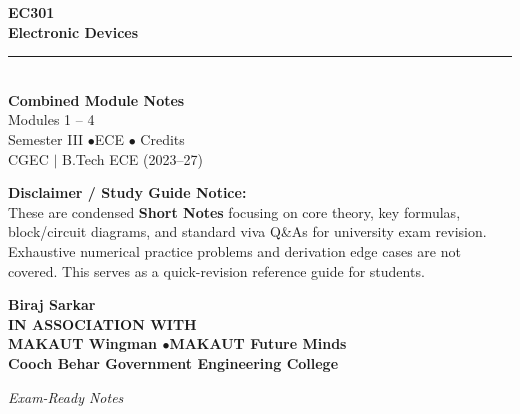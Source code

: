 \documentclass[12pt,a4paper]{article}
\begin{document}
\thispagestyle{empty}


\vspace*{1.0cm}
\begin{center}
  {\Huge\bfseries\color{myred} EC301}\\[10pt]
  {\LARGE\bfseries\color{mydark} Electronic Devices}\\[20pt]
  {\color{myred}\rule{0.7\linewidth}{1.5pt}}\\[18pt]
  {\Large\color{myteal}\textbf{Combined Module Notes}}\\[8pt]
  {\large\color{mydark} Modules 1 -- 4}\\[40pt]
  {\normalsize\color{mydark} Semester III \quad$\bullet$\quad ECE \quad$\bullet$ Credits}\\[12pt]
  {\normalsize\color{mydark} CGEC \;$|$\; B.Tech ECE (2023--27)}
\end{center}
\vspace{1.0cm}
\begin{center}
  \begin{tcolorbox}[colback=mygray, colframe=mgframe, boxrule=0.5pt, arc=3pt, width=0.85\linewidth]
    \centering\small\color{mydark}
    \textbf{Disclaimer / Study Guide Notice:}\\
    These are condensed \textbf{Short Notes} focusing on core theory, key formulas, block/circuit diagrams, and standard viva Q\&As for university exam revision. Exhaustive numerical practice problems and derivation edge cases are not covered. This serves as a quick-revision reference guide for students.
  \end{tcolorbox}
\end{center}
\vfill
\vspace{0.6cm}
\begin{center}
  {\large\bfseries\color{mypurple} Biraj Sarkar}\\[16pt]
  {\footnotesize\color{watermark}\textbf{IN ASSOCIATION WITH}}\\[8pt]
  {\small\bfseries\color{mydark} MAKAUT Wingman \quad$\bullet$\quad MAKAUT Future Minds}\\[12pt]
  {\large\bfseries\color{myteal} Cooch Behar Government Engineering College}
\end{center}
\vfill
\begin{center}{\small\color{watermark}\textit{Exam-Ready Notes}}\end{center}
\clearpage
\end{document}
